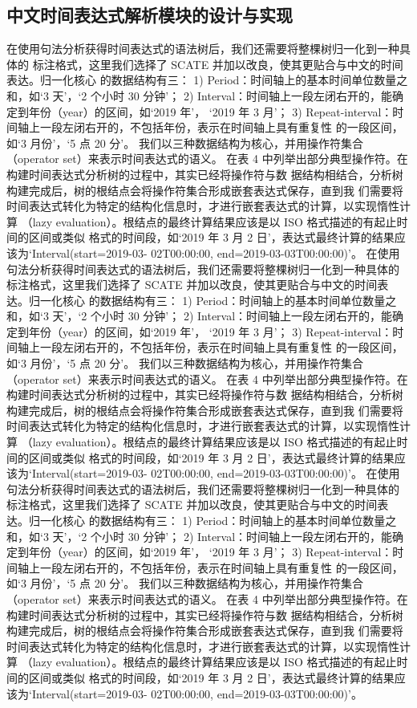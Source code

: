 \subsection{中文时间表达式解析模块的设计与实现}

在使用句法分析获得时间表达式的语法树后，我们还需要将整棵树归一化到一种具体的
标注格式，这里我们选择了 SCATE 并加以改良，使其更贴合与中文的时间表达。归一化核心
的数据结构有三：
1) Period：时间轴上的基本时间单位数量之和，如‘3 天’，‘2 个小时 30 分钟’；
2) Interval：时间轴上一段左闭右开的，能确定到年份（year）的区间，如‘2019 年’，
‘2019 年 3 月’；
3) Repeat-interval：时间轴上一段左闭右开的，不包括年份，表示在时间轴上具有重复性
的一段区间，如‘3 月份’，‘5 点 20 分’。
我们以三种数据结构为核心，并用操作符集合（operator set）来表示时间表达式的语义。
在表 4 中列举出部分典型操作符。在构建时间表达式分析树的过程中，其实已经将操作符与数
据结构相结合，分析树构建完成后，树的根结点会将操作符集合形成嵌套表达式保存，直到我
们需要将时间表达式转化为特定的结构化信息时，才进行嵌套表达式的计算，以实现惰性计算
（lazy evaluation）。根结点的最终计算结果应该是以 ISO 格式描述的有起止时间的区间或类似
格式的时间段，如‘2019 年 3 月 2 日’，表达式最终计算的结果应该为‘Interval(start=2019-03-
02T00:00:00, end=2019-03-03T00:00:00)’。
在使用句法分析获得时间表达式的语法树后，我们还需要将整棵树归一化到一种具体的
标注格式，这里我们选择了 SCATE 并加以改良，使其更贴合与中文的时间表达。归一化核心
的数据结构有三：
1) Period：时间轴上的基本时间单位数量之和，如‘3 天’，‘2 个小时 30 分钟’；
2) Interval：时间轴上一段左闭右开的，能确定到年份（year）的区间，如‘2019 年’，
‘2019 年 3 月’；
3) Repeat-interval：时间轴上一段左闭右开的，不包括年份，表示在时间轴上具有重复性
的一段区间，如‘3 月份’，‘5 点 20 分’。
我们以三种数据结构为核心，并用操作符集合（operator set）来表示时间表达式的语义。
在表 4 中列举出部分典型操作符。在构建时间表达式分析树的过程中，其实已经将操作符与数
据结构相结合，分析树构建完成后，树的根结点会将操作符集合形成嵌套表达式保存，直到我
们需要将时间表达式转化为特定的结构化信息时，才进行嵌套表达式的计算，以实现惰性计算
（lazy evaluation）。根结点的最终计算结果应该是以 ISO 格式描述的有起止时间的区间或类似
格式的时间段，如‘2019 年 3 月 2 日’，表达式最终计算的结果应该为‘Interval(start=2019-03-
02T00:00:00, end=2019-03-03T00:00:00)’。
在使用句法分析获得时间表达式的语法树后，我们还需要将整棵树归一化到一种具体的
标注格式，这里我们选择了 SCATE 并加以改良，使其更贴合与中文的时间表达。归一化核心
的数据结构有三：
1) Period：时间轴上的基本时间单位数量之和，如‘3 天’，‘2 个小时 30 分钟’；
2) Interval：时间轴上一段左闭右开的，能确定到年份（year）的区间，如‘2019 年’，
‘2019 年 3 月’；
3) Repeat-interval：时间轴上一段左闭右开的，不包括年份，表示在时间轴上具有重复性
的一段区间，如‘3 月份’，‘5 点 20 分’。
我们以三种数据结构为核心，并用操作符集合（operator set）来表示时间表达式的语义。
在表 4 中列举出部分典型操作符。在构建时间表达式分析树的过程中，其实已经将操作符与数
据结构相结合，分析树构建完成后，树的根结点会将操作符集合形成嵌套表达式保存，直到我
们需要将时间表达式转化为特定的结构化信息时，才进行嵌套表达式的计算，以实现惰性计算
（lazy evaluation）。根结点的最终计算结果应该是以 ISO 格式描述的有起止时间的区间或类似
格式的时间段，如‘2019 年 3 月 2 日’，表达式最终计算的结果应该为‘Interval(start=2019-03-
02T00:00:00, end=2019-03-03T00:00:00)’。

